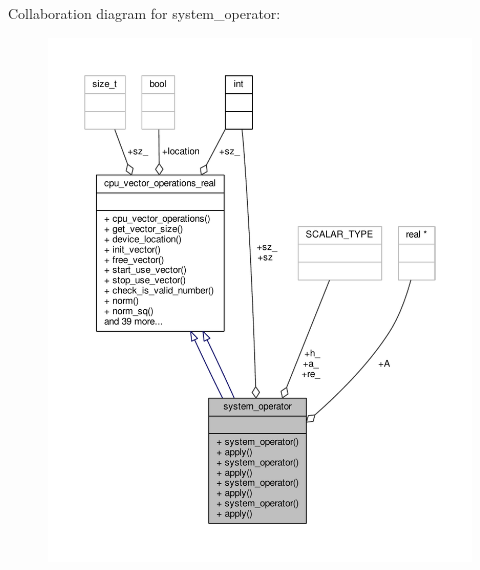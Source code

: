Collaboration diagram for system\-\_\-operator\-:\nopagebreak
\begin{figure}[H]
\begin{center}
\leavevmode
\includegraphics[width=350pt]{structsystem__operator__coll__graph}
\end{center}
\end{figure}
